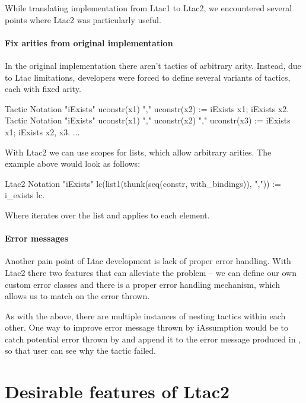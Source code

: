While translating implementation from Ltac1 to Ltac2, we encountered several points where Ltac2 was particularly useful.

\paragraph{Fix arities from original implementation}

In the original implementation there aren't tactics of arbitrary arity.
Instead, due to Ltac limitations, developers were forced to define several variants of tactics, each with fixed arity.

\begin{coq}
Tactic Notation "iExists" uconstr(x1) "," uconstr(x2) :=
  iExists x1; iExists x2.
Tactic Notation "iExists" uconstr(x1) "," uconstr(x2) "," uconstr(x3) :=
  iExists x1; iExists x2, x3.
$\ldots$
\end{coq}

With Ltac2 we can use scopes for lists, which allow arbitrary arities.
The example above would look as follows:

\begin{coq}
  Ltac2 Notation "iExists" lc(list1(thunk(seq(constr, with_bindings)), ",")) :=
  i_exists$\text{~}$lc.
\end{coq}

Where  iterates over the list and applies  to each element.

\paragraph{Error messages}

Another pain point of Ltac development is lack of proper error handling.
With Ltac2 there two features that can alleviate the problem -- we can define our own custom error classes and there is a proper error handling mechanism, which allows us to match on the error thrown.

As with the  above, there are multiple instances of nesting tactics within each other.
One way to improve error message thrown by iAssumption would be to catch potential error thrown by  and append it to the error message produced in , so that user can see why the tactic failed.

\section{Desirable features of Ltac2}

